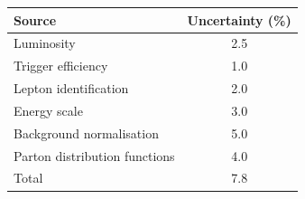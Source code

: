 \begin{tabular}{lc}
  \toprule
  Source & Uncertainty (\unit{\percent}) \\
  \midrule
  Luminosity & 2.5 \\
  Trigger efficiency & 1.0 \\
  Lepton identification & 2.0 \\
  Energy scale & 3.0 \\
  Background normalisation & 5.0 \\
  Parton distribution functions & 4.0 \\
  \midrule
  Total & 7.8 \\
  \bottomrule
\end{tabular}
